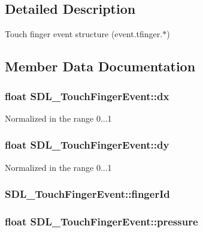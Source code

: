 \subsection{Detailed Description}
Touch finger event structure (event.\-tfinger.$\ast$) 

\subsection{Member Data Documentation}
\hypertarget{struct_s_d_l___touch_finger_event_ac6acac209d6e2bd659fdb6760081393d}{
\subsubsection[{dx}]{\setlength{\rightskip}{0pt plus 5cm}float S\-D\-L\-\_\-\-Touch\-Finger\-Event\-::dx}}\label{struct_s_d_l___touch_finger_event_ac6acac209d6e2bd659fdb6760081393d}
Normalized in the range 0...1 \hypertarget{struct_s_d_l___touch_finger_event_a9c0320c5f18a6b9d10da657e166608c9}{
\subsubsection[{dy}]{\setlength{\rightskip}{0pt plus 5cm}float S\-D\-L\-\_\-\-Touch\-Finger\-Event\-::dy}}\label{struct_s_d_l___touch_finger_event_a9c0320c5f18a6b9d10da657e166608c9}
Normalized in the range 0...1 \hypertarget{struct_s_d_l___touch_finger_event_a8616d46ed19906e3ee90a4d481d3a284}{
\subsubsection[{finger\-Id}]{ S\-D\-L\-\_\-\-Touch\-Finger\-Event\-::finger\-Id}}\label{struct_s_d_l___touch_finger_event_a8616d46ed19906e3ee90a4d481d3a284}
\hypertarget{struct_s_d_l___touch_finger_event_ab4fca822d0807b5748dbae8d3cc56524}{
\subsubsection[{pressure}]{\setlength{\rightskip}{0pt plus 5cm}float S\-D\-L\-\_\-\-Touch\-Finger\-Event\-::pressure}}\label{struct_s_d_l___touch_finger_event_ab4fca822d0807b5748dbae8d3cc56524}

